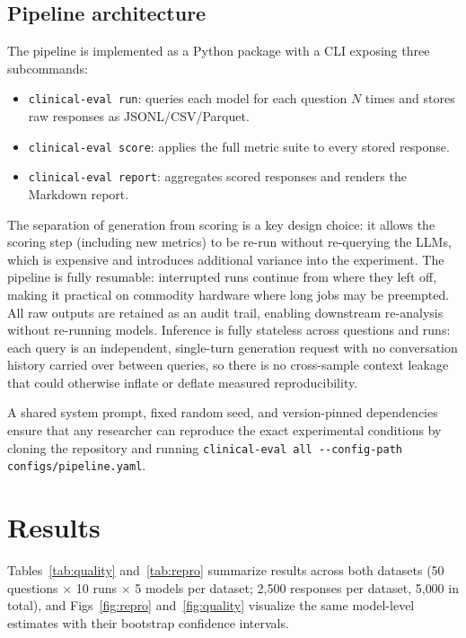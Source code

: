 \documentclass[10pt,letterpaper]{article}
\begin{document}
\subsection*{Pipeline architecture}

The pipeline is implemented as a Python package with a CLI exposing
three subcommands:

\begin{itemize}
  \item \texttt{clinical-eval run}: queries each model for each
        question $N$ times and stores raw responses as
        JSONL/CSV/Parquet.
  \item \texttt{clinical-eval score}: applies the full metric
        suite to every stored response.
  \item \texttt{clinical-eval report}: aggregates scored
        responses and renders the Markdown report.
\end{itemize}

The separation of generation from scoring is a key design choice:
it allows the scoring step (including new metrics) to be re-run
without re-querying the LLMs, which is expensive and introduces
additional variance into the experiment.
The pipeline is fully resumable: interrupted runs continue from
where they left off, making it practical on commodity hardware
where long jobs may be preempted.
All raw outputs are retained as an audit trail, enabling downstream
re-analysis without re-running models.
Inference is fully stateless across questions and runs: each query is
an independent, single-turn generation request with no conversation
history carried over between queries, so there is no cross-sample
context leakage that could otherwise inflate or deflate measured
reproducibility.

A shared system prompt, fixed random seed, and version-pinned
dependencies ensure that any researcher can reproduce the exact
experimental conditions by cloning the repository and running
\texttt{clinical-eval all -{}-config-path configs/pipeline.yaml}.

\section*{Results}
\label{sec:results}

Tables~\ref{tab:quality} and~\ref{tab:repro} summarize results across
both datasets (50 questions $\times$ 10 runs $\times$ 5 models per
dataset; 2{,}500 responses per dataset, 5{,}000 in total), and
Figs~\ref{fig:repro} and~\ref{fig:quality} visualize the same
model-level estimates with their bootstrap confidence intervals.
\end{document}
